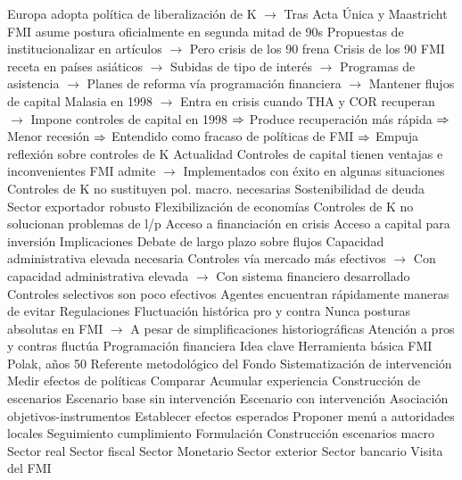 \documentclass{nuevotema}
\begin{document}
\begin{esquemal}
				\4[] Europa adopta política de liberalización de K
				\4[] $\to$ Tras Acta Única y Maastricht
				\4[] FMI asume postura oficialmente en segunda mitad de 90s
				\4[] Propuestas de institucionalizar en artículos
				\4[] $\to$ Pero crisis de los 90 frena
				\4 Crisis de los 90
				\4[] FMI receta en países asiáticos
				\4[] $\to$ Subidas de tipo de interés
				\4[] $\to$ Programas de asistencia
				\4[] $\to$ Planes de reforma vía programación financiera
				\4[] $\to$ Mantener flujos de capital
				\4[] Malasia en 1998
				\4[] $\to$ Entra en crisis cuando THA y COR recuperan
				\4[] $\to$ Impone controles de capital en 1998
				\4[] $\Rightarrow$ Produce recuperación más rápida
				\4[] $\Rightarrow$ Menor recesión
				\4[] $\Rightarrow$ Entendido como fracaso de políticas de FMI
				\4[] $\Rightarrow$ Empuja reflexión sobre controles de K
			\3 Actualidad
				\4 Controles de capital tienen ventajas e inconvenientes
				\4[] FMI admite
				\4[] $\to$ Implementados con éxito en algunas situaciones
				\4 Controles de K no sustituyen pol. macro. necesarias
				\4[] Sostenibilidad de deuda
				\4[] Sector exportador robusto
				\4[] Flexibilización de economías
				\4 Controles de K no solucionan problemas de l/p
				\4[] Acceso a financiación en crisis
				\4[] Acceso a capital para inversión
			\3 Implicaciones
				\4 Debate de largo plazo sobre flujos
				\4 Capacidad administrativa elevada necesaria
				\4[] Controles vía mercado más efectivos
				\4[] $\to$ Con capacidad administrativa elevada
				\4[] $\to$ Con sistema financiero desarrollado
				\4 Controles selectivos son poco efectivos
				\4[] Agentes encuentran rápidamente maneras de evitar
				\4[] Regulaciones
				\4 Fluctuación histórica pro y contra
				\4[] Nunca posturas absolutas en FMI
				\4[] $\to$ A pesar de simplificaciones historiográficas
				\4[] Atención a pros y contras fluctúa
		\2 Programación financiera
			\3 Idea clave
				\4 Herramienta básica FMI
				\4[] Polak, años 50
				\4[] Referente metodológico del Fondo
				\4 Sistematización de intervención
				\4[] Medir efectos de políticas
				\4[] Comparar
				\4[] Acumular experiencia
				\4 Construcción de escenarios
				\4[]  Escenario base sin intervención
				\4[]  Escenario con intervención
				\4 Asociación objetivos-instrumentos
				\4[]  Establecer efectos esperados
				\4[]  Proponer menú a autoridades locales
				\4[]  Seguimiento cumplimiento
			\3 Formulación
				\4 Construcción escenarios macro
				\4[]  Sector real
				\4[]  Sector fiscal
				\4[]  Sector Monetario
				\4[]  Sector exterior
				\4[]  Sector bancario
				\4[]  Visita del FMI

\end{esquemal}
\end{document}
